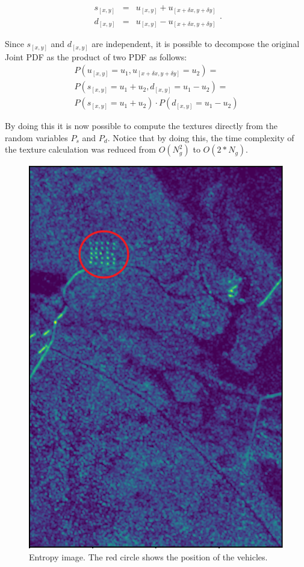 \begin{equation}
    \begin{array}{ccc}
         s_{[x,y]} &=& u_{[x,y]} + u_{[x+\delta x, y+\delta y]} \\
         d_{[x,y]} &=& u_{[x,y]} - u_{[x+\delta x, y+\delta y]}
    \end{array}.
\end{equation} 

Since $s_{[x,y]}$ and $d_{[x,y]}$ are independent, it is possible to decompose the original Joint PDF as the product of two PDF as follows:
\begin{equation}
    \begin{array}{rrr}
       P(u_{[x,y]}=u_1, u_{[x+\delta x, y+\delta y]}=u_2) = \\ P(s_{[x,y]}=u_1+u_2, d_{[x,y]}=u_1-u_2) = \\
    P(s_{[x,y]}=u_1+u_2) \cdot P(d_{[x,y]} = u_1-u_2) 
    \end{array}
\end{equation}

By doing this it is now possible to compute the textures directly from the random variables $P_s$ and $P_d$. Notice that by doing this, the time 
complexity of the texture calculation was reduced from $O(N_g^2)$ to $O(2*N_g)$.

\begin{figure}[ht]
    \centering
    \includegraphics[width=0.45\linewidth]{Chapter7/entropy_examplepng.png}
    \caption{Entropy image. The red circle shows the position of the vehicles.}
    \label{fig:entropy_example}
\end{figure}

